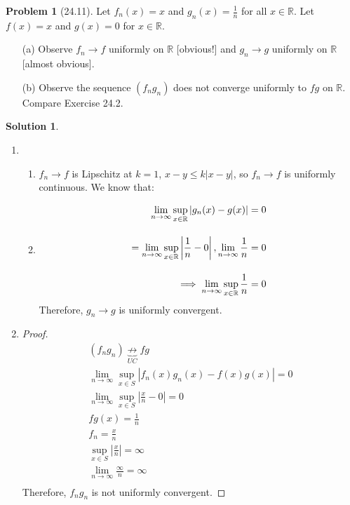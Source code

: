 \documentclass[12pt]{article}
\theoremstyle{definition} %
\newtheorem{solution}{Solution}
\newtheorem{problem}{Problem}
\theoremstyle{plain} %
\begin{document}
\begin{problem}[24.11]
    Let $ f_n(x) = x $ and $ g_n(x) = \frac{1}{n} $ for all $ x \in \mathbb{R} $. Let $ f(x) = x $ and $ g(x) = 0 $ for $ x \in \mathbb{R} $.

\begin{enumerate}
    \item[(a)] Observe $ f_n \to f $ uniformly on $ \mathbb{R} $ [obvious!] and $ g_n \to g $ uniformly on $ \mathbb{R} $ [almost obvious].
    \item[(b)] Observe the sequence $ (f_n g_n) $ does not converge uniformly to $ fg $ on $ \mathbb{R} $. Compare Exercise 24.2.
\end{enumerate}
\end{problem}
\begin{solution}
     \begin{enumerate}
    \item \begin{enumerate}
        \item $f_{n}\to f$ is Lipschitz at $k=1$, $x-y\leq k\left\vert x-y \right\vert $, so $f_{n}\to f$ is uniformly continuous. We know that:
        \item \begin{align}
            \lim_{n \to \infty}\sup_{x\in \mathbb{\MakeUppercase{r}}}\left\vert g_{n}(x)-g(x) \right\vert= 0\\[10pt] 
            = \lim_{n \to \infty}\sup_{x\in \mathbb{\MakeUppercase{r}}} \left\vert \frac{1}{n}-0 \right\vert, \lim_{n \to \infty} \frac{1}{n}=0 \\[10pt] 
            \implies \lim_{n \to \infty} \sup_{x\in \mathbb{\MakeUppercase{r}} } \frac{1}{n}=0
        \end{align}
        Therefore, $g_{n}\to g$ is uniformly convergent. 
        \end{enumerate}
    \item \begin{proof}
        \begin{align}
            (f_{n}g_{n}) \underbrace{\not\to}_{UC} fg \\[10pt] 
            \lim_{n \to \infty} \sup_{x\in S} \left\vert f_{n}(x)g_{n}(x)-f(x)g(x) \right\vert = 0\\[10pt] 
            \lim_{n \to \infty} \sup_{x\in S} \left\vert \frac{x}{n}-0 \right\vert =0 \\[10pt] 
            fg(x) = \frac{1}{n} \\[10pt] 
            f_{n}=\frac{x}{n} \\[10pt] 
            \sup_{x\in S}\left\vert \frac{x}{n} \right\vert = \infty \\[10pt] 
            \lim_{n \to \infty} \frac{\infty}{n} = \infty \\[10pt] 
        \end{align}
        Therefore, $f_{n}g_{n}$ is not uniformly convergent. 
    \end{proof}
     \end{enumerate}
    \end{solution}
\end{document}
